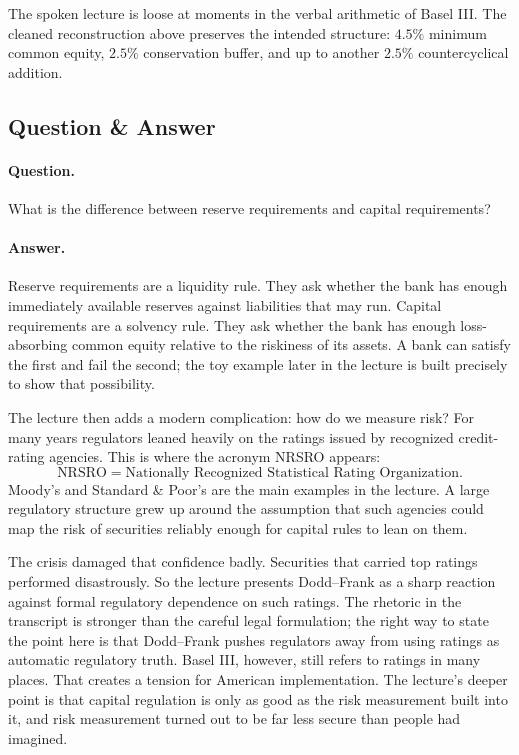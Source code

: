 \begin{remark}
The spoken lecture is loose at moments in the verbal arithmetic of Basel III. The cleaned reconstruction above preserves the intended structure: \(4.5\%\) minimum common equity, \(2.5\%\) conservation buffer, and up to another \(2.5\%\) countercyclical addition.
\end{remark}

\subsection{Question \& Answer}

\paragraph{Question.} What is the difference between reserve requirements and capital requirements?

\paragraph{Answer.} Reserve requirements are a liquidity rule. They ask whether the bank has enough immediately available reserves against liabilities that may run. Capital requirements are a solvency rule. They ask whether the bank has enough loss-absorbing common equity relative to the riskiness of its assets. A bank can satisfy the first and fail the second; the toy example later in the lecture is built precisely to show that possibility.

The lecture then adds a modern complication: how do we measure risk? For many years regulators leaned heavily on the ratings issued by recognized credit-rating agencies. This is where the acronym NRSRO appears:
\begin{equation}
\text{NRSRO} = \text{Nationally Recognized Statistical Rating Organization}.
\end{equation}
Moody's and Standard \& Poor's are the main examples in the lecture. A large regulatory structure grew up around the assumption that such agencies could map the risk of securities reliably enough for capital rules to lean on them.

The crisis damaged that confidence badly. Securities that carried top ratings performed disastrously. So the lecture presents Dodd--Frank as a sharp reaction against formal regulatory dependence on such ratings. The rhetoric in the transcript is stronger than the careful legal formulation; the right way to state the point here is that Dodd--Frank pushes regulators away from using ratings as automatic regulatory truth. Basel III, however, still refers to ratings in many places. That creates a tension for American implementation. The lecture's deeper point is that capital regulation is only as good as the risk measurement built into it, and risk measurement turned out to be far less secure than people had imagined.

